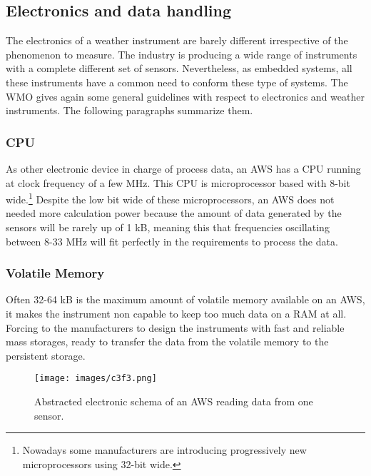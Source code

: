 {\subsection{Electronics and data handling}\label{3.1.2}

The electronics of a weather instrument are barely different irrespective of the phenomenon to measure. The industry is producing a wide range of instruments with a complete different set of sensors. Nevertheless, as embedded systems, all these instruments have a common need to conform these type of systems. The \gls{WMO} gives again some general guidelines with respect to electronics and weather instruments.  The following paragraphs summarize them.

 \subsubsection{CPU}\label{cpu}
 
As other electronic device in charge of process data, an \gls{AWS} has a \gls{CPU} running at clock frequency of a few \gls{MHz}. This CPU is microprocessor based with 8-bit wide.\footnote{Nowadays some manufacturers are introducing progressively new microprocessors using 32-bit wide.} Despite the low bit wide of these microprocessors, an \gls{AWS} does not needed more calculation power because the amount of data generated by the sensors will be rarely up of 1 \gls{kB}, meaning this that frequencies oscillating between 8-33 \gls{MHz} will fit perfectly in the requirements to process the data.

\subsubsection{Volatile Memory}

Often 32-64 \gls{kB} is the maximum amount of volatile memory available on an \gls{AWS}, it makes the instrument non capable to keep too much data on a \gls{RAM} at all. Forcing to the manufacturers to design the instruments with fast and reliable mass storages, ready to transfer the data from the volatile memory to the persistent storage.

\begin{figure}[htb]
\centerline{\texttt{[image: images/c3f3.png]}}
\caption{Abstracted electronic schema of an \protect \gls{AWS} reading data from one sensor.}
\label{f3.3}
\end{figure}

}
